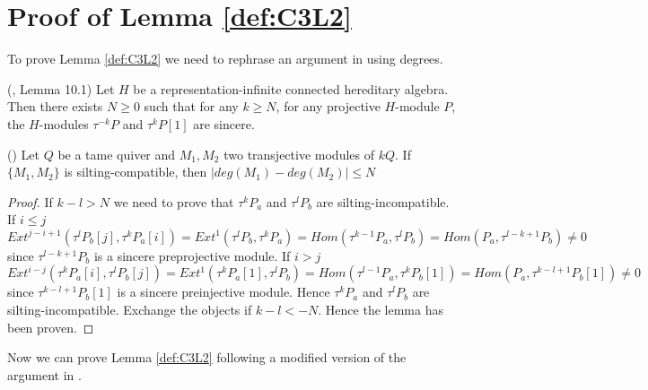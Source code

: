 \section{Proof of Lemma \ref{def:C3L2}}
\indent To prove Lemma \ref{def:C3L2} we need to rephrase an argument in \cite{BDP13} using degrees.
\begin{lemma}
(\cite{BDP13}, Lemma 10.1) Let $H$ be a representation-infinite connected hereditary algebra. Then there exists $N\geq 0$ such that for any $k\geq N$, for any projective $H$-module $P$, the $H$-modules $\tau^{-k}P$ and $\tau^kP[1]$ are sincere.
\end{lemma}
\begin{lemma}
(\cite{BDP13}) Let $Q$ be a tame quiver and $M_1,M_2$ two transjective modules of $kQ$. If $\{M_1,M_2\}$ is silting-compatible, then $|deg(M_1)-deg(M_2)|\leq N$ 
\end{lemma}
\begin{proof}
If $k-l>N$ we need to prove that $\tau^kP_a$ and $\tau^lP_b$ are silting-incompatible. If $i\leq j$ $Ext^{j-i+1}(\tau^lP_b[j],\tau^kP_a[i])=Ext^1(\tau^lP_b,\tau^kP_a)=Hom(\tau^{k-1}P_a,\tau^l P_b)=Hom(P_a,\tau^{l-k+1}P_b)\neq 0$ since $\tau^{l-k+1}P_b$ is a sincere preprojective module. If $i>j$ $Ext^{i-j}(\tau^kP_a[i],\tau^lP_b[j])=Ext^1(\tau^kP_a[1],\tau^lP_b)=Hom(\tau^{l-1}P_a,\tau^k P_b[1])=Hom(P_a,\tau^{k-l+1}P_b[1])\neq 0$ since $\tau^{k-l+1}P_b[1]$ is a sincere preinjective module. Hence $\tau^kP_a$ and $\tau^lP_b$ are silting-incompatible. Exchange the objects if $k-l<-N$. Hence the lemma has been proven.
\end{proof}
\indent Now we can prove Lemma \ref{def:C3L2} following a modified version of the argument in \cite{BDP13}.
